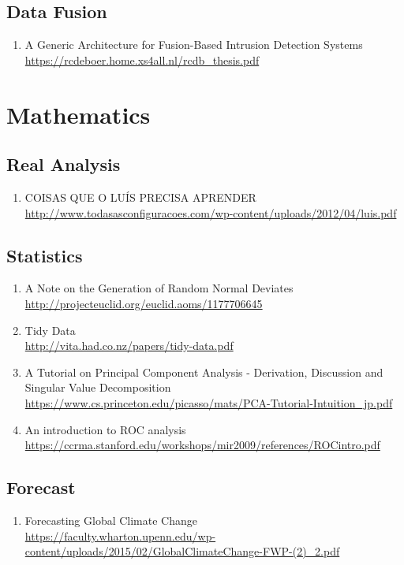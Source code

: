 \documentclass{article}
\begin{document}
\subsection{Data Fusion}
\begin{enumerate}
	\item {A Generic Architecture for Fusion-Based Intrusion Detection Systems\\
\url{https://rcdeboer.home.xs4all.nl/rcdb_thesis.pdf}}
\end{enumerate}

\section{Mathematics}
\subsection{Real Analysis}
\begin{enumerate}
	\item {COISAS QUE O LUÍS PRECISA APRENDER\\
\url{http://www.todasasconfiguracoes.com/wp-content/uploads/2012/04/luis.pdf}}
\end{enumerate}
\subsection {Statistics}
\begin{enumerate}
	\item {A Note on the Generation of Random Normal Deviates\\
\url{http://projecteuclid.org/euclid.aoms/1177706645}}
	\item {Tidy Data\\
\url{http://vita.had.co.nz/papers/tidy-data.pdf}}
	\item {A Tutorial on Principal Component Analysis - Derivation, Discussion and Singular Value Decomposition\\
\url{https://www.cs.princeton.edu/picasso/mats/PCA-Tutorial-Intuition_jp.pdf}}
	\item{An introduction to ROC analysis\\
\url{https://ccrma.stanford.edu/workshops/mir2009/references/ROCintro.pdf}}
\end{enumerate}
\subsection{Forecast}
\begin{enumerate}
	\item {Forecasting Global Climate Change\\
\url{https://faculty.wharton.upenn.edu/wp-content/uploads/2015/02/GlobalClimateChange-FWP-(2)_2.pdf}}
\end{enumerate}
\end{document}
